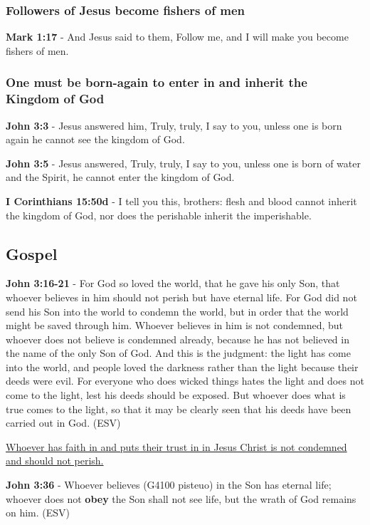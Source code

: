 \documentclass[11pt]{article}
\begin{document}
\subsubsection{Followers of Jesus become fishers of men}
\label{sec:orgdc562ec}

\textbf{Mark 1:17} - And Jesus said to them, Follow me, and I will make you become fishers of men.

\subsubsection{One must be born-again to enter in and inherit the Kingdom of God}
\label{sec:org5e207b1}
\textbf{John 3:3} - Jesus answered him, Truly, truly, I say to you, unless one is born again he cannot see the kingdom of God.

\textbf{John 3:5} - Jesus answered, Truly, truly, I say to you, unless one is born of water and the Spirit, he cannot enter the kingdom of God.

\textbf{I Corinthians 15:50d} - I tell you this, brothers: flesh and blood cannot inherit the kingdom of God, nor does the perishable inherit the imperishable.

\subsection{Gospel}
\label{sec:org7ace635}
\textbf{John 3:16-21} - For God so loved the world, that he gave his only Son, that whoever believes in him should not perish but have eternal life. For God did not send his Son into the world to condemn the world, but in order that the world might be saved through him. Whoever believes in him is not condemned, but whoever does not believe is condemned already, because he has not believed in the name of the only Son of God. And this is the judgment: the light has come into the world, and people loved the darkness rather than the light because their deeds were evil. For everyone who does wicked things hates the light and does not come to the light, lest his deeds should be exposed. But whoever does what is true comes to the light, so that it may be clearly seen that his deeds have been carried out in God. (ESV)

\uline{Whoever has faith in and puts their trust in in Jesus Christ is not condemned and should not perish.}

\textbf{John 3:36} - Whoever believes (G4100 pisteuo) in the Son has eternal life; whoever does not \textbf{obey} the Son shall not see life, but the wrath of God remains on him. (ESV)
\end{document}
